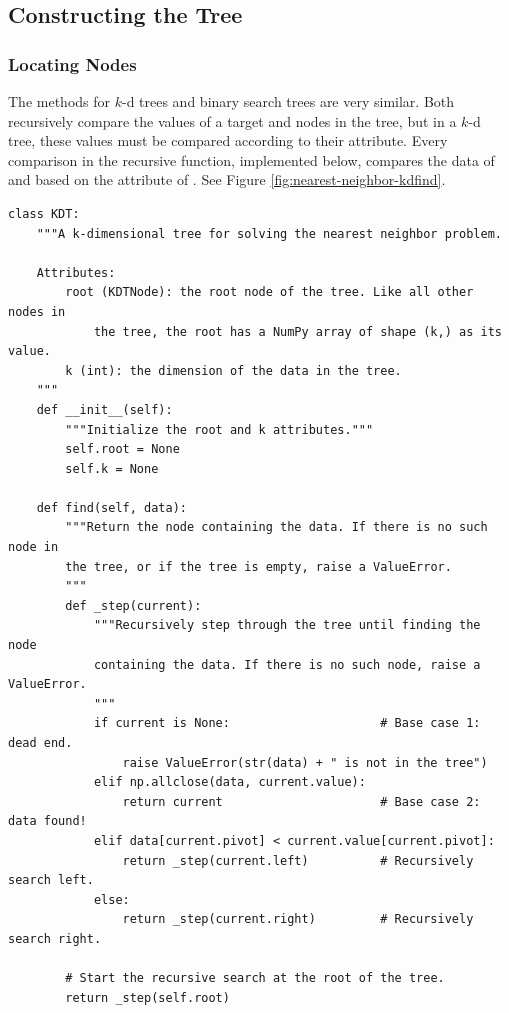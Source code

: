 
\subsection*{Constructing the Tree} %

\subsubsection*{Locating Nodes} %

The  methods for $k$-d trees and binary search trees are very similar.
Both recursively compare the values of a target and nodes in the tree, but in a $k$-d tree, these values must be compared according to their  attribute.
Every comparison in the recursive  function, implemented below, compares the data of  and  based on the  attribute of .
See Figure \ref{fig:nearest-neighbor-kdfind}.

\begin{lstlisting}
class KDT:
    """A k-dimensional tree for solving the nearest neighbor problem.

    Attributes:
        root (KDTNode): the root node of the tree. Like all other nodes in
            the tree, the root has a NumPy array of shape (k,) as its value.
        k (int): the dimension of the data in the tree.
    """
    def __init__(self):
        """Initialize the root and k attributes."""
        self.root = None
        self.k = None

    def find(self, data):
        """Return the node containing the data. If there is no such node in
        the tree, or if the tree is empty, raise a ValueError.
        """
        def _step(current):
            """Recursively step through the tree until finding the node
            containing the data. If there is no such node, raise a ValueError.
            """
            if current is None:                     # Base case 1: dead end.
                raise ValueError(str(data) + " is not in the tree")
            elif np.allclose(data, current.value):
                return current                      # Base case 2: data found!
            elif data[current.pivot] < current.value[current.pivot]:
                return _step(current.left)          # Recursively search left.
            else:
                return _step(current.right)         # Recursively search right.

        # Start the recursive search at the root of the tree.
        return _step(self.root)
\end{lstlisting}

